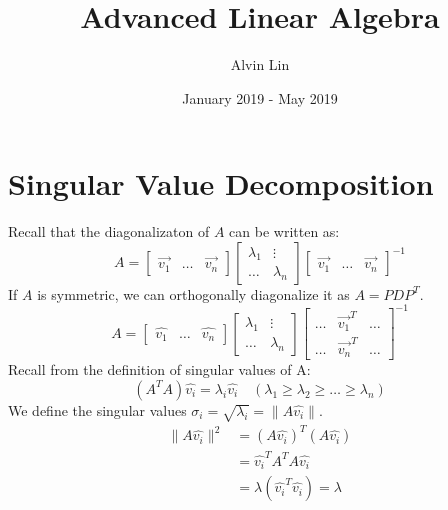 \documentclass{math}
\title{Advanced Linear Algebra}
\author{Alvin Lin}
\date{January 2019 - May 2019}
\begin{document}
\maketitle

\section*{Singular Value Decomposition}
Recall that the diagonalizaton of \( A \) can be written as:
\[ A = \begin{bmatrix}\vec{v_1} & \dots & \vec{v_n}\end{bmatrix}
  \begin{bmatrix}
    \lambda_1 & \vdots \\
    \dots & \lambda_n
  \end{bmatrix}\begin{bmatrix}\vec{v_1} & \dots & \vec{v_n}\end{bmatrix}^{-1} \]
If \( A \) is symmetric, we can orthogonally diagonalize it as \( A = PDP^T \).
\[ A = \begin{bmatrix}\hat{v_1} & \dots & \hat{v_n}\end{bmatrix}
  \begin{bmatrix}
    \lambda_1 & \vdots \\
    \dots & \lambda_n
  \end{bmatrix}\begin{bmatrix}
    \dots & \vec{v_1}^T & \dots \\
    \dots & \vec{v_n}^T & \dots
  \end{bmatrix}^{-1} \]
Recall from the definition of singular values of A:
\[ (A^TA)\hat{v_i} = \lambda_i\hat{v_i} \quad
  (\lambda_1\ge\lambda_2\ge\dots\ge\lambda_n) \]
We define the singular values \( \sigma_i = \sqrt{\lambda_i} =
\|A\hat{v_i}\| \).
\begin{align*}
  \|A\hat{v_i}\|^2 &= (A\hat{v_i})^T(A\hat{v_i}) \\
  &= \hat{v_i}^TA^TA\hat{v_i} \\
  &= \lambda(\hat{v_i}^T\hat{v_i}) = \lambda
\end{align*}
\end{document}
